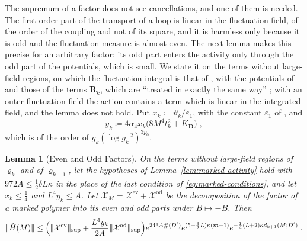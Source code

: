\documentclass[11pt]{preprint}
\DeclarePairedDelimiter{\norm}{\lVert}{\rVert}
\numberwithin{equation}{section}
\newtheorem{lemma}{Lemma}[section]
\theoremstyle{definition}
\theoremstyle{remark}
\theoremstyle{plain}
\begin{document}
The supremum of a factor does not see cancellations, and one of them is needed. The first-order part of the transport of a loop is linear in the fluctuation field, of the order of the coupling and not of its square, and it is harmless only because it is odd and the fluctuation measure is almost even. The next lemma makes this precise for an arbitrary factor: its odd part enters the activity only through the odd part of the potentials, which is small. We state it on the terms without large-field regions, on which the fluctuation integral is that of \cite[Sect.~2]{BalabanRG2}, with the potentials of \cite[Lemmata~1,~2]{BalabanRG2} and those of the terms $\mathbf R_k$, which are ``treated in exactly the same way'' \cite[p.~276]{BalabanCRE}; with an outer fluctuation field the action contains a term which is linear in the integrated field, and the lemma does not hold. Put $x_k \coloneqq \vartheta_k/\varepsilon_1$, with the constant $\varepsilon_1$ of \cite[(1.34)]{BalabanRG2}, and
\begin{equation}\label{eq:odd-potential-constant}
    y_k \coloneqq 4\alpha_4x_k\bigl(8M^4t_k^2 + K_{\mathbf D}\bigr)\;,
\end{equation}
which is of the order of $g_k(\log g_k^{-2})^{3p_0}$.

\begin{lemma}[Even and Odd Factors]\label{lem:parity}
On the terms without large-field regions of $\varrho_k$ and of $\varrho_{k+1}$, let the hypotheses of Lemma~\ref{lem:marked-activity} hold with $972A \leq \frac12\delta L\kappa$ in the place of the last condition of \eqref{eq:marked-conditions}, and let $x_k \leq \frac14$ and $L^4y_k \leq A$. Let $\mathcal X_M = \mathcal X^{\mathrm{ev}} + \mathcal X^{\mathrm{od}}$ be the decomposition of the factor of a marked polymer into its even and odd parts under $B \mapsto -B$. Then
\begin{equation}\label{eq:parity-bound}
    \norm{\tilde H(M)} \leq \Bigl(\norm{\mathcal X^{\mathrm{ev}}}_{\sup} + \frac{L^4y_k}{2A}\norm{\mathcal X^{\mathrm{od}}}_{\sup}\Bigr)e^{243A\#(D')}e^{(5 + \frac32L)\kappa(m - 1)}e^{-\frac14(L + 2)\kappa d_{k+1}(M; D')}\;.
\end{equation}
\end{lemma}
\end{document}
